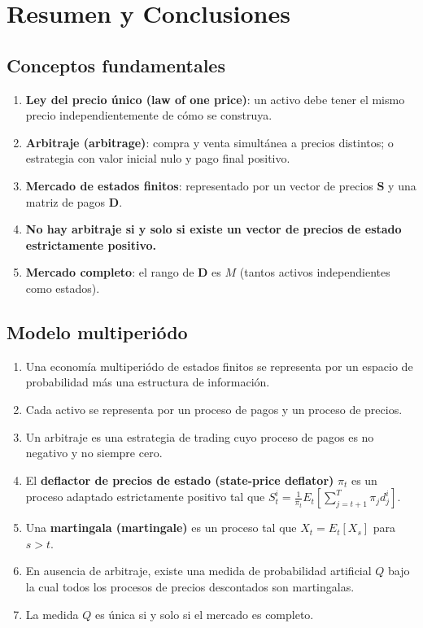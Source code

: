 \documentclass[12pt]{article}
\begin{document}
\section{Resumen y Conclusiones}

\subsection{Conceptos fundamentales}

\begin{enumerate}
    \item \textbf{Ley del precio \'unico (law of one price)}: un activo debe tener el mismo precio independientemente de c\'omo se construya.
    \item \textbf{Arbitraje (arbitrage)}: compra y venta simult\'anea a precios distintos; o estrategia con valor inicial nulo y pago final positivo.
    \item \textbf{Mercado de estados finitos}: representado por un vector de precios $\mathbf{S}$ y una matriz de pagos $\mathbf{D}$.
    \item \textbf{No hay arbitraje si y solo si existe un vector de precios de estado estrictamente positivo.}
    \item \textbf{Mercado completo}: el rango de $\mathbf{D}$ es $M$ (tantos activos independientes como estados).
\end{enumerate}

\subsection{Modelo multiperi\'odo}

\begin{enumerate}
    \item Una econom\'ia multiperi\'odo de estados finitos se representa por un espacio de probabilidad m\'as una estructura de informaci\'on.
    \item Cada activo se representa por un proceso de pagos y un proceso de precios.
    \item Un arbitraje es una estrategia de trading cuyo proceso de pagos es no negativo y no siempre cero.
    \item El \textbf{deflactor de precios de estado (state-price deflator)} $\pi_t$ es un proceso adaptado estrictamente positivo tal que $S_t^i = \frac{1}{\pi_t} E_t\left[\sum_{j=t+1}^T \pi_j d_j^i\right]$.
    \item Una \textbf{martingala (martingale)} es un proceso tal que $X_t = E_t[X_s]$ para $s > t$.
    \item En ausencia de arbitraje, existe una medida de probabilidad artificial $Q$ bajo la cual todos los procesos de precios descontados son martingalas.
    \item La medida $Q$ es \'unica si y solo si el mercado es completo.
\end{enumerate}
\end{document}
